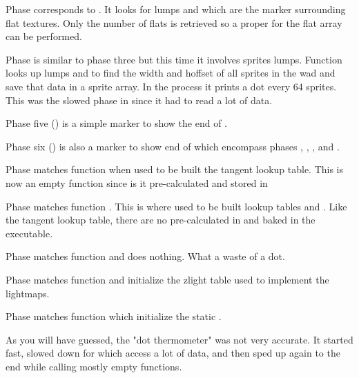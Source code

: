 Phase  corresponds to . It looks for lumps  and  which are the marker surrounding flat textures. Only the number of flats is retrieved so a proper  for the flat array can be performed.\\
\par

Phase  is similar to phase three but this time it involves sprites lumps. Function  looks up lumps  and  to find the width and hoffset of all sprites in the wad  and save that data in a sprite array. In the process it prints a dot every 64 sprites. This was the slowed phase in  since it had to read a lot of data.\\
\par

Phase five () is a simple marker to show the end of .\\
\par

Phase six () is also a marker to show end of  which encompass phases , , , and .\\
\par

Phase  matches function  when used to be built the tangent lookup table. This is now an empty function since is it pre-calculated and stored in \\
\par

Phase  matches function . This is where used to be built lookup tables  and . Like the tangent lookup table, there are no pre-calculated in  and baked in the executable.\\
\par

Phase  matches function  and does nothing. What a waste of a dot.\\
\par

Phase  matches function  and initialize the zlight table used to implement the lightmaps.\\
\par

Phase  matches function  which initialize the static .\\
\par
As you will have guessed, the "dot thermometer" was not very accurate. It started fast, slowed down for  which access a lot of data, and then sped up again to the end while calling mostly empty functions.